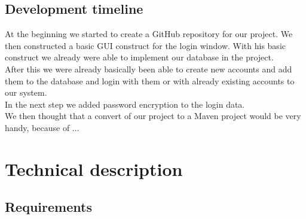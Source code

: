 \documentclass[a4paper, 12pt]{report}
\begin{document}
\section{Development timeline}
At the beginning we started to create a GitHub repository for our project. We then constructed a basic GUI construct for the login window. With his basic construct we already were able to implement our database in the project. \\
After this we were already basically been able to create new accounts and add them to the database and login with them or with already existing accounts to our system. \\
In the next step we added password encryption to the login data. \\
We then thought that a convert of our project to a Maven project would be very handy, because of ... %
\\




\chapter{Technical description}
\section{Requirements}
\end{document}
